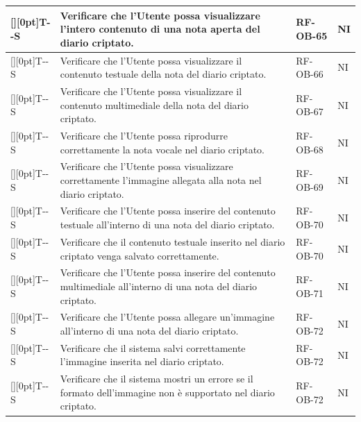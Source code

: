\documentclass[a4paper,12pt]{article}
\newcounter{testsys}
\newcommand{\systestcode}{%
  \raisebox{0pt}[\height][0pt]{\hypertarget{T-\arabic{testsys}-S}{}}T-\arabic{testsys}-S%
}
\begin{document}
\begin{longtable}{| >{\centering\arraybackslash}p{} | >{\raggedright\arraybackslash}p{} | >{\centering\arraybackslash}p{} | >{\centering\arraybackslash}p{} |}
\stepcounter{testsys} \systestcode & Verificare che l'Utente possa visualizzare l'intero contenuto di una nota aperta del diario criptato. & RF-OB-65 & NI \\
\hline

\stepcounter{testsys} \systestcode & Verificare che l'Utente possa visualizzare il contenuto testuale della nota del diario criptato. & RF-OB-66 & NI \\
\hline

\stepcounter{testsys} \systestcode & Verificare che l'Utente possa visualizzare il contenuto multimediale della nota del diario criptato. & RF-OB-67 & NI \\
\hline

\stepcounter{testsys} \systestcode & Verificare che l'Utente possa riprodurre correttamente la nota vocale nel diario criptato. & RF-OB-68 & NI \\
\hline

\stepcounter{testsys} \systestcode & Verificare che l'Utente possa visualizzare correttamente l'immagine allegata alla nota nel diario criptato. & RF-OB-69 & NI \\
\hline

\stepcounter{testsys} \systestcode & Verificare che l'Utente possa inserire del contenuto testuale all'interno di una nota del diario criptato. & RF-OB-70 & NI \\
\hline

\stepcounter{testsys} \systestcode & Verificare che il contenuto testuale inserito nel diario criptato venga salvato correttamente. & RF-OB-70 & NI \\
\hline

\stepcounter{testsys} \systestcode & Verificare che l'Utente possa inserire del contenuto multimediale all'interno di una nota del diario criptato. & RF-OB-71 & NI \\
\hline

\stepcounter{testsys} \systestcode & Verificare che l'Utente possa allegare un'immagine all'interno di una nota del diario criptato. & RF-OB-72 & NI \\
\hline

\stepcounter{testsys} \systestcode & Verificare che il sistema salvi correttamente l'immagine inserita nel diario criptato. & RF-OB-72 & NI \\
\hline

\stepcounter{testsys} \systestcode & Verificare che il sistema mostri un errore se il formato dell'immagine non è supportato nel diario criptato. & RF-OB-72 & NI \\
\hline


\end{longtable}
\end{document}
